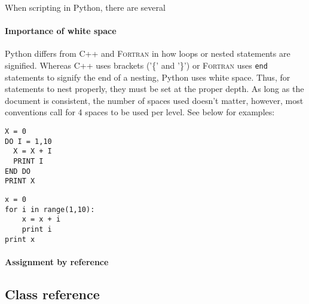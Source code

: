 \documentclass[a4paper,11pt]{report}
\begin{document}
When scripting in Python, there are several 

\subsubsection{Importance of white space}

Python differs from C++ and \textsc{Fortran} in how loops or nested statements are signified. Whereas
C++ uses brackets ('\{' and '\}') or \textsc{Fortran} uses \verb|end| statements to signify the end of a
nesting, Python uses white space. Thus, for statements to nest properly, they must be set at the 
proper depth. As long as the document is consistent, the number of spaces used doesn't matter, however,
most conventions call for 4 spaces to be used per level. See below for examples:

\begin{Verbatim}[frame=single, label=\textsc{Fortran}, baselinestretch=1, fontsize=\small]
X = 0
DO I = 1,10
  X = X + I
  PRINT I
END DO
PRINT X
\end{Verbatim}

\begin{Verbatim}[frame=single, label=Python, baselinestretch=1, fontsize=\small]
x = 0
for i in range(1,10):
    x = x + i
    print i
print x
\end{Verbatim}




\subsubsection{Assignment by reference}




\begin{appendix}

\chapter{Class reference}

 
\end{appendix}
\end{document}
